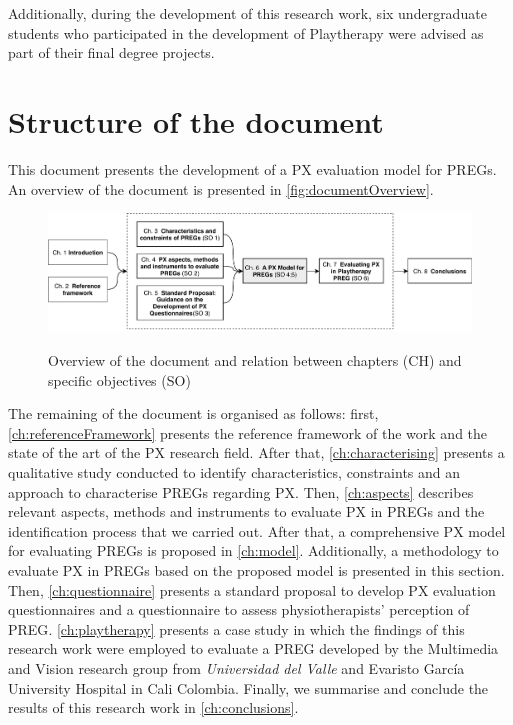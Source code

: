 Additionally, during the development of this research work, six undergraduate students who participated in the development of Playtherapy were advised as part of their final degree projects.


\section{Structure of the document}

This document presents the development of a \ac{PX} evaluation model for \acp{PREG}. An overview of the document is presented in \autoref{fig:documentOverview}.

\begin{figure}[htb]
\myfloatalign
{\includegraphics[width=\linewidth]{gfx/intro/documentOverview}} \quad
\caption{Overview of the document and relation between chapters (CH) and specific objectives (SO)}\label{fig:documentOverview}
\end{figure}

The remaining of the document is organised as follows: first, \autoref{ch:referenceFramework} presents the reference framework of the work and the state of the art of the \ac{PX} research field. After that, \autoref{ch:characterising} presents a qualitative study conducted to identify characteristics, constraints and an approach to characterise \acp{PREG} regarding \ac{PX}. Then, \autoref{ch:aspects} describes relevant aspects, methods and instruments to evaluate \ac{PX} in \acp{PREG} and the identification process that we carried out. After that, a comprehensive \ac{PX} model for evaluating \acp{PREG} is proposed in \autoref{ch:model}. Additionally, a methodology to evaluate \ac{PX} in \acp{PREG} based on the proposed model is presented in this section. Then, \autoref{ch:questionnaire} presents a standard proposal to develop \ac{PX} evaluation questionnaires and a questionnaire to assess physiotherapists' perception of \ac{PREG}. \autoref{ch:playtherapy} presents a case study in which the findings of this research work were employed to evaluate a \ac{PREG} developed by the Multimedia and Vision research group from \textit{Universidad del Valle} and Evaristo Garc\'ia University Hospital in Cali Colombia. Finally, we summarise and conclude the results of this research work in \autoref{ch:conclusions}.